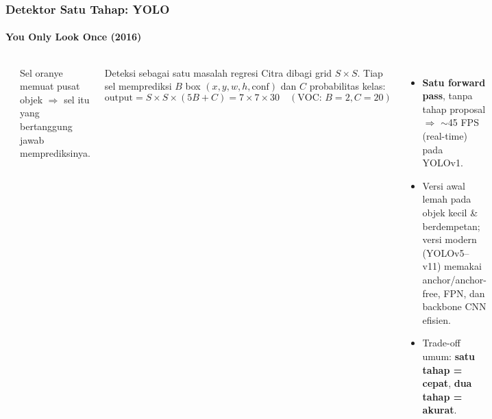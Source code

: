 \documentclass[t,aspectratio=169,xcolor=dvipsnames]{beamer}
\begin{document}
\begin{frame}
    \frametitle{Detektor Satu Tahap: YOLO}
    \framesubtitle{You Only Look Once (2016)}
    \footnotesize

    \begin{columns}[T]
        \begin{center}
        \end{center}
        {\scriptsize\color{dlMute} Sel oranye memuat pusat objek $\Rightarrow$ sel itu yang bertanggung jawab memprediksinya.}

        \begin{block}{Deteksi sebagai satu masalah regresi}
            Citra dibagi grid $S\times S$. Tiap sel memprediksi $B$ box $(x,y,w,h,\text{conf})$ dan $C$ probabilitas kelas:
            $$\text{output} = S\times S\times(5B+C) = 7\times7\times30 \quad (\text{VOC: } B{=}2, C{=}20)$$
        \end{block}
        \begin{itemize}
            \item \textbf{Satu forward pass}, tanpa tahap proposal $\Rightarrow$ $\sim$45 FPS (real-time) pada YOLOv1.
            \item Versi awal lemah pada objek kecil \& berdempetan; versi modern (YOLOv5--v11) memakai anchor/anchor-free, FPN, dan backbone CNN efisien.
            \item Trade-off umum: \textbf{satu tahap = cepat}, \textbf{dua tahap = akurat}.
        \end{itemize}
    \end{columns}
\end{frame}
\end{document}
